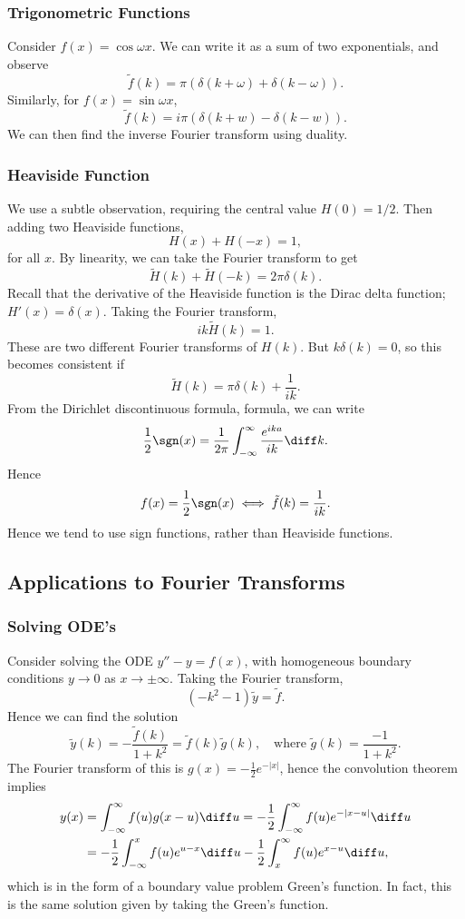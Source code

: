 \documentclass[12pt]{article}
\begin{document}
\subsubsection{Trigonometric Functions}%
\label{subsub:trigonometric_functions}

Consider $f(x) = \cos \omega x$. We can write it as a sum of two exponentials, and observe
\[
	\tilde f(k) = \pi (\delta(k + \omega) + \delta(k - \omega))
.\]
Similarly, for $f(x) = \sin \omega x$,
\[
	\tilde f(k) = i \pi(\delta(k+w) - \delta(k - w))
.\]
We can then find the inverse Fourier transform using duality.

\subsubsection{Heaviside Function}%
\label{subsub:heaviside_function}

We use a subtle observation, requiring the central value $H(0) = 1/2$. Then adding two Heaviside functions,
\[
	H(x) + H(-x) = 1
,\]
for all $x$. By linearity, we can take the Fourier transform to get
\[
	\tilde H(k) + \tilde H(-k) = 2 \pi \delta(k)
.\]
Recall that the derivative of the Heaviside function is the Dirac delta function; $H'(x) = \delta(x)$. Taking the Fourier transform,
\[
	ik \tilde H(k) = 1
.\]
These are two different Fourier transforms of $H(k)$. But $k\delta(k) = 0$, so this becomes consistent if
\[
	\tilde H(k) = \pi \delta(k) + \frac{1}{ik}
.\]
From the Dirichlet discontinuous formula, formula, we can write
\[
	\frac{1}{2} \sgn(x) = \frac{1}{2\pi} \int_{-\infty}^{\infty} \frac{e^{ika}}{ik} \diff k
.\]
Hence
\[
	f(x) = \frac{1}{2} \sgn(x) \iff \tilde f(k) = \frac{1}{ik}
.\]
Hence we tend to use sign functions, rather than Heaviside functions.

\subsection{Applications to Fourier Transforms}%
\label{sub:applications_to_fourier_transforms}

\subsubsection{Solving ODE's}%
\label{subsub:solving_ode_s}

Consider solving the ODE $y'' - y = f(x)$, with homogeneous boundary conditions $y \to 0$ as $x \to \pm \infty$. Taking the Fourier transform,
\[
	(-k^2 - 1)\tilde y = \tilde f
.\]
Hence we can find the solution
\[
	\tilde y(k) = - \frac{\tilde f(k)}{1 + k^2} = \tilde f(k) \tilde g(k), \quad \text{where } \tilde g(k) = \frac{-1}{1 + k^2}
.\]
The Fourier transform of this is $g(x) = - \frac{1}{2} e^{-|x|}$, hence the convolution theorem implies
\begin{align*}
	y(x) &= \int_{-\infty}^{\infty} f(u)g(x - u) \diff u = -\frac{1}{2} \int_{-\infty}^{\infty} f(u) e^{-|x-u|}\diff u \\
	     &= -\frac{1}{2} \int_{-\infty}^{x} f(u) e^{u - x} \diff u - \frac{1}{2} \int_{x}^{\infty} f(u) e^{x - u}\diff u,
\end{align*}
which is in the form of a boundary value problem Green's function. In fact, this is the same solution given by taking the Green's function.
\end{document}
